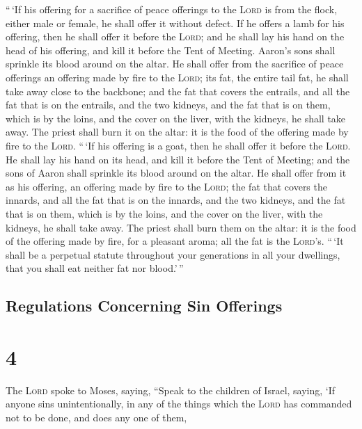  ``\,`If his offering for a sacrifice of peace offerings
to the \textsc{Lord} is from the flock, either male or female, he shall
offer it without defect.  If he offers a lamb for his
offering, then he shall offer it before the \textsc{Lord};
 and he shall lay his hand on the head of his offering,
and kill it before the Tent of Meeting. Aaron's sons shall sprinkle its
blood around on the altar.  He shall offer from the
sacrifice of peace offerings an offering made by fire to the
\textsc{Lord}; its fat, the entire tail fat, he shall take away close to
the backbone; and the fat that covers the entrails, and all the fat that
is on the entrails,  and the two kidneys, and the fat
that is on them, which is by the loins, and the cover on the liver, with
the kidneys, he shall take away.  The priest shall burn
it on the altar: it is the food of the offering made by fire to the
\textsc{Lord}.  ``\,`If his offering is a goat, then he
shall offer it before the \textsc{Lord}.  He shall lay
his hand on its head, and kill it before the Tent of Meeting; and the
sons of Aaron shall sprinkle its blood around on the altar.
 He shall offer from it as his offering, an offering made
by fire to the \textsc{Lord}; the fat that covers the innards, and all
the fat that is on the innards,  and the two kidneys, and
the fat that is on them, which is by the loins, and the cover on the
liver, with the kidneys, he shall take away.  The priest
shall burn them on the altar: it is the food of the offering made by
fire, for a pleasant aroma; all the fat is the \textsc{Lord}'s.
 ``\,`It shall be a perpetual statute throughout your
generations in all your dwellings, that you shall eat neither fat nor
blood.'\,''

\hypertarget{regulations-concerning-sin-offerings}{%
\subsection{Regulations Concerning Sin
Offerings}\label{regulations-concerning-sin-offerings}}

\hypertarget{section-3}{%
\section{4}\label{section-3}}

 The \textsc{Lord} spoke to Moses, saying, 
``Speak to the children of Israel, saying, `If anyone sins
unintentionally, in any of the things which the \textsc{Lord} has
commanded not to be done, and does any one of them,

